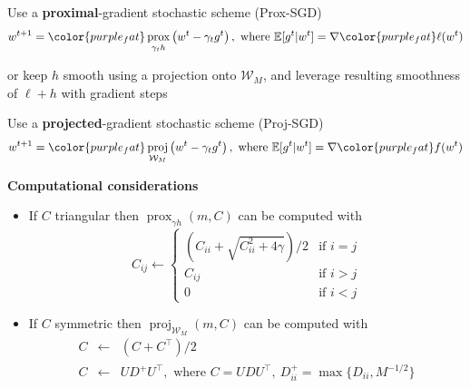 \documentclass[final]{beamer}
\newcommand{\vsp}{\vspace{15pt}} %
\DeclareMathOperator{\prox}{prox}
\DeclareMathOperator{\proj}{proj}
\begin{document}
\begin{frame}{}
\begin{columns}[t]
\begin{column}{0.30\linewidth}
\begin{colorblock}[backgroundcolor=orange_dark]
\begin{colorframe}[backgroundcolor=orange_clear, linecolor=purple_fat]
	{\color{purple_fat}\textbf{}} Use a {\color{purple_fat}\textbf{proximal}}-gradient stochastic scheme (Prox-SGD) 
	\begin{equation*}
	w^{t+1} = {\color{purple_fat}\prox_{\gamma_t h}} \left( w^t - \gamma_t g^t \right), \text{ where } \mathbb{E}[g^t | w^t] = \nabla {\color{purple_fat}\ell}(w^t)
	\end{equation*}
\end{colorframe}


or 
keep $h$ smooth using a projection onto $\mathcal{W}_M$, and leverage resulting smoothness of $\ell + h$ with gradient steps

\begin{colorframe}[backgroundcolor=orange_clear, linecolor=purple_fat]
{\color{purple_fat}\textbf{}} Use a {\color{purple_fat}\textbf{projected}}-gradient stochastic scheme (Proj-SGD)
\begin{equation*}
w^{t+1} = {\color{purple_fat}\proj_{\mathcal{W}_M}} \left( w^t - \gamma_t g^t \right), \text{ where } \mathbb{E}[g^t | w^t] = \nabla {\color{purple_fat}f}(w^t)
\end{equation*}
\end{colorframe}
\end{colorblock}






\begin{colorblock}[backgroundcolor=orange_dark]

\textbf{\large Computational considerations }

\vsp \vsp

\begin{itemize}
	\item[{\color{purple_fat}\textbf{\ding{192}}}] 
	If $C$ triangular
 then $\prox_{\gamma h}(m,C)$ can be computed with
    \vsp
	\begin{equation*}
	C_{ij} \leftarrow 
	\begin{cases}
	(C_{ii} + \sqrt{C_{ii}^2 + 4\gamma })/2 & \text{if } i=j \\
	C_{ij} & \text{if } i>j \\
	0 & \text{if } i<j
	\end{cases}
	\end{equation*}		
	\vsp
	
	\item[{\color{purple_fat}\textbf{\ding{193}}}] 
If $C$ symmetric then
 $\proj_{\mathcal{W}_M}(m,C)$ can be computed with
 \vsp
	\begin{eqnarray*}
	C & \leftarrow & (C+C^\top)/2 \\
	C & \leftarrow & U D^+ U^\top, \text{ where } C = UDU^\top, \ D^+_{ii} = \max\{D_{ii},M^{-1/2}\}
	\end{eqnarray*}
\end{itemize}



\end{colorblock}
\end{column}
\end{columns}
\end{frame}
\end{document}
